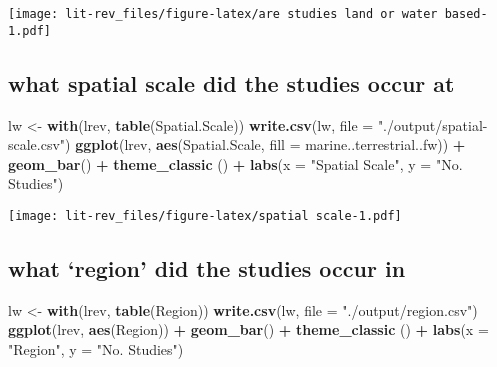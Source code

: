 \documentclass[
]{article}
\newenvironment{Shaded}{\begin{snugshade}}{\end{snugshade}}
\newcommand{\DataTypeTok}[1]{\textcolor[rgb]{0.13,0.29,0.53}{#1}}
\newcommand{\KeywordTok}[1]{\textcolor[rgb]{0.13,0.29,0.53}{\textbf{#1}}}
\newcommand{\NormalTok}[1]{#1}
\newcommand{\OperatorTok}[1]{\textcolor[rgb]{0.81,0.36,0.00}{\textbf{#1}}}
\newcommand{\StringTok}[1]{\textcolor[rgb]{0.31,0.60,0.02}{#1}}
\begin{document}
\texttt{[image: lit-rev\_files/figure-latex/are studies land or water based-1.pdf]}

\hypertarget{what-spatial-scale-did-the-studies-occur-at}{%
\subsection{what spatial scale did the studies occur
at}\label{what-spatial-scale-did-the-studies-occur-at}}

\begin{Shaded}
\begin{Highlighting}[]
\NormalTok{lw <-}\StringTok{ }\KeywordTok{with}\NormalTok{(lrev, }\KeywordTok{table}\NormalTok{(Spatial.Scale))}
\KeywordTok{write.csv}\NormalTok{(lw, }\DataTypeTok{file =} \StringTok{"./output/spatial-scale.csv"}\NormalTok{)}
\KeywordTok{ggplot}\NormalTok{(lrev, }\KeywordTok{aes}\NormalTok{(Spatial.Scale, }\DataTypeTok{fill =}\NormalTok{ marine..terrestrial..fw)) }\OperatorTok{+}\StringTok{ }\KeywordTok{geom_bar}\NormalTok{() }\OperatorTok{+}\StringTok{ }\KeywordTok{theme_classic}\NormalTok{ () }\OperatorTok{+}\StringTok{ }\KeywordTok{labs}\NormalTok{(}\DataTypeTok{x =} \StringTok{"Spatial Scale"}\NormalTok{, }\DataTypeTok{y =} \StringTok{"No. Studies"}\NormalTok{)}
\end{Highlighting}
\end{Shaded}

\texttt{[image: lit-rev\_files/figure-latex/spatial scale-1.pdf]}

\hypertarget{what-region-did-the-studies-occur-in}{%
\subsection{what `region' did the studies occur
in}\label{what-region-did-the-studies-occur-in}}

\begin{Shaded}
\begin{Highlighting}[]
\NormalTok{lw <-}\StringTok{ }\KeywordTok{with}\NormalTok{(lrev, }\KeywordTok{table}\NormalTok{(Region))}
\KeywordTok{write.csv}\NormalTok{(lw, }\DataTypeTok{file =} \StringTok{"./output/region.csv"}\NormalTok{)}
\KeywordTok{ggplot}\NormalTok{(lrev, }\KeywordTok{aes}\NormalTok{(Region)) }\OperatorTok{+}\StringTok{ }\KeywordTok{geom_bar}\NormalTok{() }\OperatorTok{+}\StringTok{ }\KeywordTok{theme_classic}\NormalTok{ () }\OperatorTok{+}\StringTok{ }\KeywordTok{labs}\NormalTok{(}\DataTypeTok{x =} \StringTok{"Region"}\NormalTok{, }\DataTypeTok{y =} \StringTok{"No. Studies"}\NormalTok{)}
\end{Highlighting}
\end{Shaded}
\end{document}
